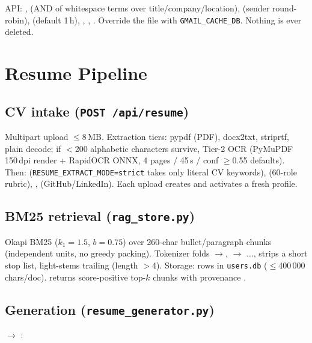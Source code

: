 \documentclass[11pt,a4paper]{article}
\newcommand{\file}[1]{\texttt{\small #1}}
\newcommand{\env}[1]{\texttt{\small #1}}
\newcommand{\api}[2]{\texttt{\small #1\,#2}}
\begin{document}
API: ,  (AND of whitespace
terms over title/company/location),  (sender
round-robin),  (default 1\,h), ,
, . Override the file with
\env{GMAIL\_CACHE\_DB}. Nothing is ever deleted.

\section{Resume Pipeline}
\label{sec:resume}

\subsection{CV intake (\api{POST}{/api/resume})}
Multipart upload $\leq$8\,MB. Extraction tiers: pypdf (PDF), docx2txt,
striprtf, plain decode; if $<$200 alphabetic characters survive, Tier-2 OCR
(PyMuPDF 150\,dpi render + RapidOCR ONNX, 4 pages / 45\,s / conf $\geq$0.55
defaults). Then:  (\env{RESUME\_EXTRACT\_MODE=strict}
takes only literal CV keywords),  (60-role rubric),
,  (GitHub/LinkedIn). Each upload
creates and activates a fresh profile.

\subsection{BM25 retrieval (\file{rag\_store.py})}
Okapi BM25 ($k_1=1.5$, $b=0.75$) over 260-char bullet/paragraph chunks
(independent units, no greedy packing). Tokenizer folds
$\rightarrow$, $\rightarrow$
$\ldots$, strips a short stop list, light-stems trailing 
(length $>$4). Storage:  rows in \file{users.db}
($\leq$400\,000 chars/doc).  returns
score-positive top-$k$ chunks with provenance
.

\subsection{Generation (\file{resume\_generator.py})}
$\rightarrow$ :
\end{document}
